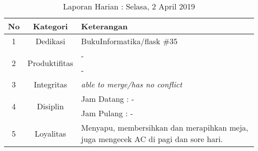 \begin{table}[htp]
\begin{center}
\caption{Laporan Harian : Selasa, 2 April 2019}
\label{tab:lh020419}
\begin{tabularx}{\textwidth}{|l|l|X|}
\hline
\multicolumn{1}{|c|}{\textbf{No}} & \multicolumn{1}{c|}{\textbf{Kategori}} & \textbf{Keterangan} \\ \hline
\multicolumn{1}{|c|}{\multirow{1}{*}{1}} & \multicolumn{1}{c|}{\multirow{1}{*}{\parbox{2.5cm}{Dedikasi}}}
& BukuInformatika/flask \#35\\
\hline
\multicolumn{1}{|c|}{\multirow{2}{*}{2}} & \multicolumn{1}{c|}{\multirow{2}{*}{\parbox{2.5cm}{Produktifitas}}}
& -\\
\multicolumn{1}{|c|}{\multirow{1}{*}{}} & \multicolumn{1}{c|}{\multirow{1}{*}{\parbox{2.5cm}{}}}
& -\\
\hline
\multicolumn{1}{|c|}{\multirow{1}{*}{3}} & \multicolumn{1}{c|}{\multirow{1}{*}{\parbox{2.5cm}{Integritas}}}
& \textit{able to merge/has no conflict} \\
\hline
\multicolumn{1}{|c|}{\multirow{2}{*}{4}} & \multicolumn{1}{c|}{\multirow{2}{*}{\parbox{2.5cm}{Disiplin}}}
& Jam Datang : - \\
\multicolumn{1}{|c|}{\multirow{1}{*}{}} & \multicolumn{1}{c|}{\multirow{1}{*}{\parbox{2.5cm}{}}}
& Jam Pulang : - \\
\hline
\multicolumn{1}{|c|}{\multirow{2}{*}{5}} & \multicolumn{1}{c|}{\multirow{2}{*}{\parbox{2.5cm}{Loyalitas}}}
& Menyapu, membersihkan dan merapihkan meja, juga mengecek AC di pagi dan sore hari.\\
\hline
\end{tabularx}
\end{center}
\end{table}


